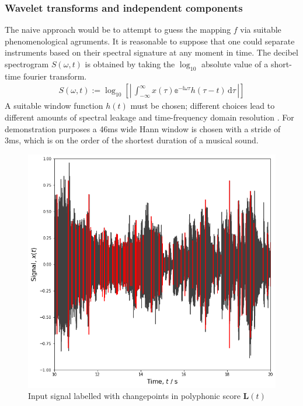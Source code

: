 \documentclass{article}[12pt]
\numberwithin{equation}{section}
\begin{document}
\subsubsection{Wavelet transforms and independent components}
The naive approach would be to attempt to guess the mapping $f$ via suitable
phenomenological agruments. It is reasonable to suppose that one could separate
instruments based on their spectral signature at any moment in time. The decibel
spectrogram $S(\omega,t)$ is obtained by taking the $\log_{10}$ absolute value
of a short-time fourier transform.
\begin{align}
	S(\omega,t):=\log_{10}\left[\left|\,
	\int_{-\infty}^{\infty}\!
		x(\tau)\mathbb{e}^{-\mathbb{i}\omega \tau}h(\tau-t)
	\,\mathrm{d}\tau
	\,\right|\right]
\end{align}
A suitable window function $h(t)$ must be chosen; different choices lead to
different amounts of spectral leakage and time-frequency domain resolution
\cite{}. For demonstration purposes a 46ms wide Hann window is chosen with a
stride of 3ms, which is on the order of the shortest duration of a musical
sound.
\begin{figure}[H]
\centering{}
\captionsetup{justification=centering}
\includegraphics[scale=0.5]{signal}
\caption{
Input signal labelled with changepoints in polyphonic score $\mathbf{L}(t)$}
\label{fig:signal}
\end{figure}
\end{document}
